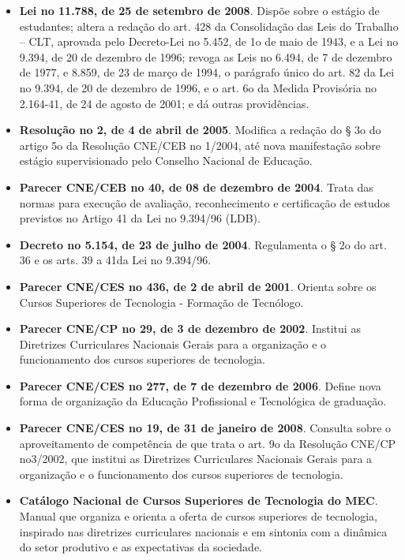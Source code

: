 \begin{itemize}
\item \textbf{Lei no 11.788, de 25 de setembro de 2008}. Dispõe sobre o estágio de estudantes; altera a redação do art. 428 da Consolidação das Leis do Trabalho – CLT, aprovada pelo Decreto-Lei no 5.452, de 1o de maio de 1943, e a Lei no 9.394, de 20 de dezembro de 1996; revoga as Leis no 6.494, de 7 de dezembro de 1977, e 8.859, de 23 de março de 1994, o parágrafo único do art. 82 da Lei no 9.394, de 20 de dezembro de 1996, e o art. 6o da Medida Provisória no 2.164-41, de 24 de agosto de 2001; e dá outras providências.

\item \textbf{Resolução no 2, de 4 de abril de 2005}. Modifica a redação do § 3o do artigo 5o da Resolução CNE/CEB no 1/2004, até nova manifestação sobre estágio supervisionado pelo Conselho Nacional de Educação.

\item \textbf{Parecer CNE/CEB no 40, de 08 de dezembro de 2004}. Trata das normas para execução de avaliação, reconhecimento e certificação de estudos previstos no Artigo 41 da Lei no 9.394/96 (LDB).

\item \textbf{Decreto no 5.154, de 23 de julho de 2004}. Regulamenta o § 2o do art. 36 e os arts. 39 a 41da Lei no 9.394/96.

\item \textbf{Parecer CNE/CES no 436, de 2 de abril de 2001}. Orienta sobre os Cursos Superiores de Tecnologia - Formação de Tecnólogo.

\item \textbf{Parecer CNE/CP no 29, de 3 de dezembro de 2002}. Institui as Diretrizes Curriculares Nacionais Gerais para a organização e o funcionamento dos cursos superiores de tecnologia.

\item \textbf{Parecer CNE/CES no 277, de 7 de dezembro de 2006}. Define nova forma de organização da Educação Profissional e Tecnológica de graduação.

\item \textbf{Parecer CNE/CES no 19, de 31 de janeiro de 2008}. Consulta sobre o aproveitamento de competência de que trata o art. 9o da Resolução CNE/CP no3/2002, que institui as Diretrizes Curriculares Nacionais Gerais para a organização e o funcionamento dos cursos superiores de tecnologia.

\item \textbf{Catálogo Nacional de Cursos Superiores de Tecnologia do MEC}. Manual que organiza e orienta a oferta de cursos superiores de tecnologia, inspirado nas diretrizes curriculares nacionais e em sintonia com a dinâmica do setor produtivo e as expectativas da sociedade.


\end{itemize}
